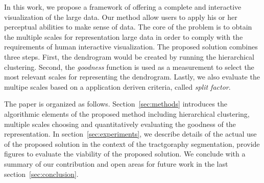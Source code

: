 In this work, we propose a framework of offering a complete and interactive visualization of the large data. Our method allow users to apply his or her perceptual abilities to make sense of data. 
The core of the problem is to obtain the multiple scales for representation large data in order to comply with the requirements of human interactive visualization. The proposed solution combines three steps. First, the dendrogram would be created by running the hierarchical clustering. Second, the \emph{goodness} function is used as a measurement to select the most relevant scales for representing the dendrogram. Lastly, we also evaluate the multipe scales based on a application deriven criteria, called \emph{split factor}. 


The paper is organized as follows. Section~\ref{sec:methods} introduces the
algorithmic elements of the proposed method including hierarchical clustering, multiple scales choosing and quantitatively evaluating the goodness of the representation. In section~\ref{sec:experiments}, we describe details of the actual use of the proposed solution in the context of the tractgoraphy segmentation, provide figures to evaluate the viability of the proposed solution. We conclude with a summary of our contribution and open areas for future work in the last section~\ref{sec:conclusion}.

